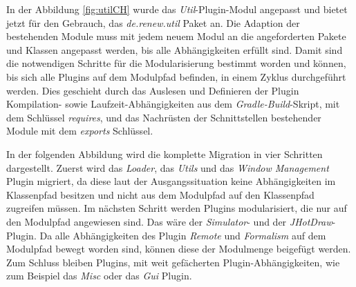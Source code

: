	In der Abbildung \ref{fig:utilCH} wurde das \textit{Util}-Plugin-Modul angepasst und bietet jetzt für den Gebrauch, das \textit{de.renew.util} Paket an.\newline
	Die Adaption der bestehenden Module muss mit jedem neuem Modul an die angeforderten Pakete und Klassen angepasst werden, bis alle Abhängigkeiten erfüllt sind.\newline
	Damit sind die notwendigen Schritte für die Modularisierung bestimmt worden und können, bis sich alle Plugins auf dem Modulpfad befinden, in einem Zyklus durchgeführt werden. Dies geschieht durch das Auslesen und Definieren der Plugin Kompilation- sowie Laufzeit-Abhängigkeiten aus dem \textit{Gradle-Build}-Skript, mit dem Schlüssel \textit{requires}, und das Nachrüsten der Schnittstellen bestehender Module mit dem \textit{exports} Schlüssel. \bigbreak

	In der folgenden Abbildung wird die komplette Migration in vier Schritten dargestellt. Zuerst wird das \textit{Loader}, das \textit{Utils} und das \textit{Window Management} Plugin migriert, da diese laut der Ausgangssituation keine Abhängigkeiten im Klassenpfad besitzen und nicht aus dem Modulpfad auf den Klassenpfad zugreifen müssen. Im nächsten Schritt werden Plugins modularisiert, die nur auf den Modulpfad angewiesen sind. Das wäre der \textit{Simulator}- und der \textit{JHotDraw}-Plugin. Da alle Abhängigkeiten des Plugin \textit{Remote} und \textit{Formalism} auf dem Modulpfad bewegt worden sind, können diese der Modulmenge beigefügt werden. Zum Schluss bleiben Plugins, mit weit gefächerten Plugin-Abhängigkeiten, wie zum Beispiel das \textit{Misc} oder das \textit{Gui} Plugin.  \bigbreak

